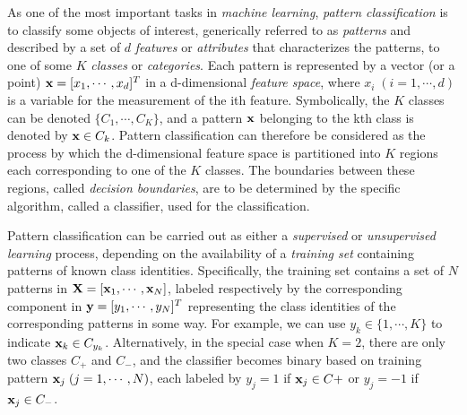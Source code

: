 \documentclass{article}
\begin{document}






As one of the most important tasks in {\em machine learning}, 
{\em pattern classification} is to classify some objects of interest, 
generically referred to as {\em patterns} and described by a set of $d$ 
{\em features} or {\em attributes} that characterizes the patterns, 
to one of some $K$ {\em classes} or {\em categories}. Each pattern is
represented by a vector (or a point) ${\bf x}=[x_1,\cdots,x_d]^T$ in 
a d-dimensional {\em feature space}, where $x_i\;(i=1,\cdots,d)$ is a 
variable for the measurement of the ith feature. Symbolically, the $K$ 
classes can be denoted $\{C_1,\cdots,C_K\}$, and a pattern ${\bf x}$ 
belonging to the kth class is denoted by ${\bf x}\in C_k$. Pattern 
classification can therefore be considered as the process by which 
the d-dimensional feature space is partitioned into $K$ regions each 
corresponding to one of the $K$ classes. The boundaries between these 
regions, called {\em decision boundaries}, are to be determined by the 
specific algorithm, called a classifier, used for the classification.

Pattern classification can be carried out as either a {\em supervised}
or {\em unsupervised learning} process, depending on the availability
of a {\em training set} containing patterns of known class identities.
Specifically, the training set contains a set of $N$ patterns in 
${\bf X}=[{\bf x}_1,\cdots,{\bf x}_N]$, labeled respectively by the
corresponding component in ${\bf y}=[ y_1,\cdots,y_N]^T$ representing 
the class identities of the corresponding patterns in some way. For
example, we can use $y_k \in \{1,\cdots,K\}$ to indicate ${\bf x}_k
\in C_{y_k}$. Alternatively, in the special case when $K=2$, there are 
only two classes $C_+$ and $C_-$, and the classifier becomes binary 
based on training pattern ${\bf x}_j\;(j=1,\cdots,N)$, each labeled by 
$y_j=1$ if ${\bf x}_j\in C+$ or $y_j=-1$ if ${\bf x}_j\in C_-$.
\end{document}
